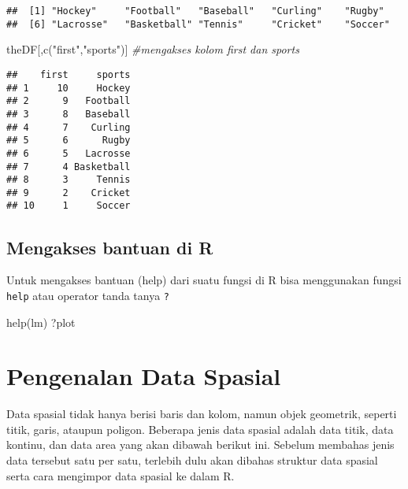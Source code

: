\documentclass[
]{book}
\newenvironment{Shaded}{\begin{snugshade}}{\end{snugshade}}
\newcommand{\CommentTok}[1]{\textcolor[rgb]{0.56,0.35,0.01}{\textit{#1}}}
\newcommand{\FunctionTok}[1]{\textcolor[rgb]{0.00,0.00,0.00}{#1}}
\newcommand{\NormalTok}[1]{#1}
\newcommand{\StringTok}[1]{\textcolor[rgb]{0.31,0.60,0.02}{#1}}
\begin{document}
\begin{verbatim}
##  [1] "Hockey"     "Football"   "Baseball"   "Curling"    "Rugby"     
##  [6] "Lacrosse"   "Basketball" "Tennis"     "Cricket"    "Soccer"
\end{verbatim}

\begin{Shaded}
\begin{Highlighting}[]
\NormalTok{theDF[,}\FunctionTok{c}\NormalTok{(}\StringTok{"first"}\NormalTok{,}\StringTok{"sports"}\NormalTok{)] }\CommentTok{\#mengakses kolom first dan sports}
\end{Highlighting}
\end{Shaded}

\begin{verbatim}
##    first     sports
## 1     10     Hockey
## 2      9   Football
## 3      8   Baseball
## 4      7    Curling
## 5      6      Rugby
## 6      5   Lacrosse
## 7      4 Basketball
## 8      3     Tennis
## 9      2    Cricket
## 10     1     Soccer
\end{verbatim}

\hypertarget{mengakses-bantuan-di-r}{%
\subsection{Mengakses bantuan di R}\label{mengakses-bantuan-di-r}}

Untuk mengakses bantuan (help) dari suatu fungsi di R bisa menggunakan fungsi \texttt{help} atau operator tanda tanya \texttt{?}

\begin{Shaded}
\begin{Highlighting}[]
\FunctionTok{help}\NormalTok{(lm)}
\NormalTok{?plot}
\end{Highlighting}
\end{Shaded}

\hypertarget{pengenalan-data-spasial}{%
\section{Pengenalan Data Spasial}\label{pengenalan-data-spasial}}

Data spasial tidak hanya berisi baris dan kolom, namun objek geometrik, seperti titik, garis, ataupun poligon. Beberapa jenis data spasial adalah data titik, data kontinu, dan data area yang akan dibawah berikut ini. Sebelum membahas jenis data tersebut satu per satu, terlebih dulu akan dibahas struktur data spasial serta cara mengimpor data spasial ke dalam R.
\end{document}
